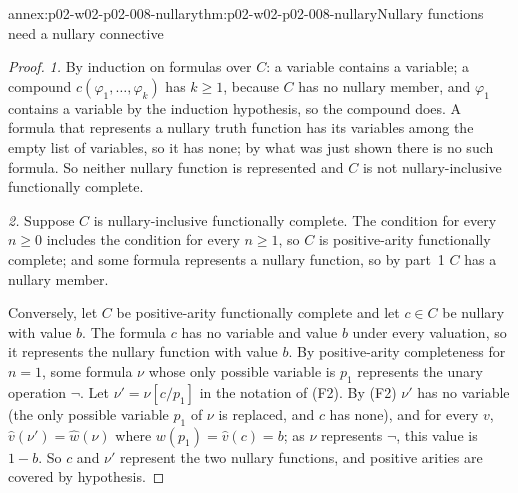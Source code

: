 \begin{annexitem}{annex:p02-w02-p02-008-nullary}{thm:p02-w02-p02-008-nullary}{Nullary functions need a nullary connective}
\begin{proof}
\emph{1.}  By induction on formulas over \(C\): a variable contains a
variable; a compound \(c(\varphi_1,\ldots,\varphi_k)\) has \(k\geq1\),
because \(C\) has no nullary member, and \(\varphi_1\) contains a variable by
the induction hypothesis, so the compound does.  A formula that represents a
nullary truth function has its variables among the empty list of variables,
so it has none; by what was just shown there is no such formula.  So neither
nullary function is represented and \(C\) is not nullary-inclusive
functionally complete.

\emph{2.}  Suppose \(C\) is nullary-inclusive functionally complete.  The
condition for every \(n\geq0\) includes the condition for every \(n\geq1\),
so \(C\) is positive-arity functionally complete; and some formula
represents a nullary function, so by part~1 \(C\) has a nullary member.

Conversely, let \(C\) be positive-arity functionally complete and let
\(c\in C\) be nullary with value \(b\).  The formula \(c\) has no variable
and value \(b\) under every valuation, so it represents the nullary function
with value \(b\).  By positive-arity completeness for \(n=1\), some formula
\(\nu\) whose only possible variable is \(p_1\) represents the unary
operation \(\neg\).  Let \(\nu'=\nu[c/p_1]\) in the notation of (F2).  By
(F2) \(\nu'\) has no variable (the only possible variable \(p_1\) of
\(\nu\) is replaced, and \(c\) has none), and for every \(v\),
\(\widehat v(\nu')=\widehat w(\nu)\) where \(w(p_1)=\widehat v(c)=b\); as
\(\nu\) represents \(\neg\), this value is \(1-b\).  So \(c\) and \(\nu'\)
represent the two nullary functions, and positive arities are covered by
hypothesis.
\end{proof}
\end{annexitem}

